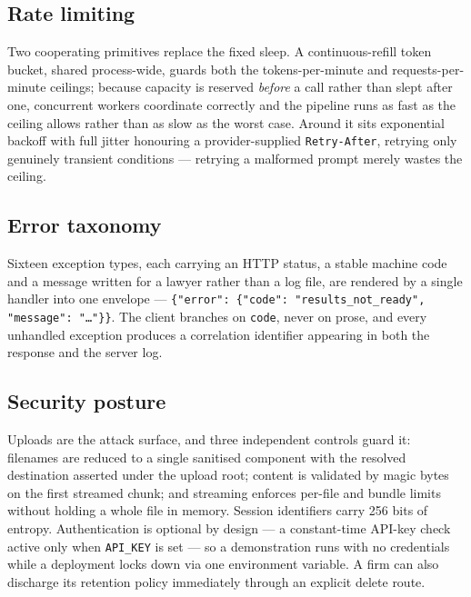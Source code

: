 \documentclass[11pt,a4paper]{article}
\newcommand{\code}[1]{\texttt{\small #1}}
\begin{document}
\subsection{Rate limiting}

Two cooperating primitives replace the fixed sleep. A continuous-refill token bucket,
shared process-wide, guards both the tokens-per-minute and requests-per-minute ceilings;
because capacity is reserved \emph{before} a call rather than slept after one, concurrent
workers coordinate correctly and the pipeline runs as fast as the ceiling allows rather than
as slow as the worst case. Around it sits exponential backoff with full jitter honouring a
provider-supplied \code{Retry-After}, retrying only genuinely transient conditions ---
retrying a malformed prompt merely wastes the ceiling.

\subsection{Error taxonomy}

Sixteen exception types, each carrying an HTTP status, a stable machine code and a message
written for a lawyer rather than a log file, are rendered by a single handler into one
envelope --- \code{\{"error": \{"code": "results\_not\_ready", "message": "\ldots"\}\}}.
The client branches on \code{code}, never on prose, and every unhandled exception produces
a correlation identifier appearing in both the response and the server log.

\subsection{Security posture}

Uploads are the attack surface, and three independent controls guard it: filenames are
reduced to a single sanitised component with the resolved destination asserted under the
upload root; content is validated by magic bytes on the first streamed chunk; and streaming
enforces per-file and bundle limits without holding a whole file in memory. Session
identifiers carry 256 bits of entropy. Authentication is optional by design --- a
constant-time API-key check active only when \code{API\_KEY} is set --- so a demonstration
runs with no credentials while a deployment locks down via one environment variable. A firm
can also discharge its retention policy immediately through an explicit delete route.

\end{document}
